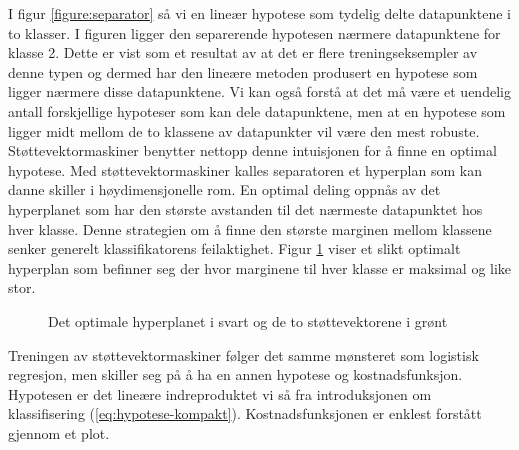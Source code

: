 I figur \ref{figure:separator} så vi en lineær hypotese som tydelig delte datapunktene i to klasser. I figuren ligger den separerende hypotesen nærmere datapunktene for klasse 2. Dette er vist som et resultat av at det er flere treningseksempler av denne typen og dermed har den lineære metoden produsert en hypotese som ligger nærmere disse datapunktene. Vi kan også forstå at det må være et uendelig antall forskjellige hypoteser som kan dele datapunktene, men at en hypotese som ligger midt mellom de to klassene av datapunkter vil være den mest robuste. Støttevektormaskiner benytter nettopp denne intuisjonen for å finne en optimal hypotese. Med støttevektormaskiner kalles separatoren et hyperplan som kan danne skiller i høydimensjonelle rom. En optimal deling oppnås av det hyperplanet som har den største avstanden til det nærmeste datapunktet hos hver klasse. Denne strategien om å finne den største marginen mellom klassene senker generelt klassifikatorens feilaktighet. Figur \ref{figure:svm} viser et slikt optimalt hyperplan som befinner seg der hvor marginene til hver klasse er maksimal og like stor.
\begin{figure}[h!]
\centering
{}
\caption{Det optimale hyperplanet i svart og de to støttevektorene i grønt}
\label{figure:svm}
\end{figure}
Treningen av støttevektormaskiner følger det samme mønsteret som logistisk regresjon, men skiller seg på å ha en annen hypotese og kostnadsfunksjon. Hypotesen er det lineære indreproduktet vi så fra introduksjonen om klassifisering (\ref{eq:hypotese-kompakt}). Kostnadsfunksjonen er enklest forstått gjennom et plot.
